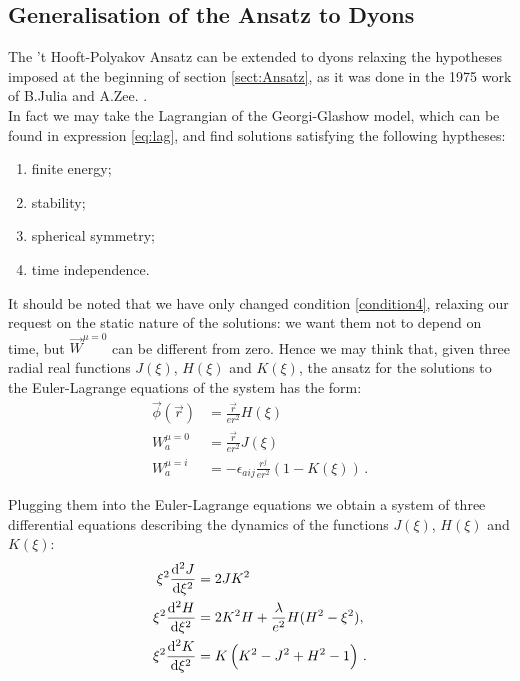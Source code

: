 \documentclass[main.tex]{subfiles}
\begin{document}
\subsection{Generalisation of the Ansatz to Dyons}
The 't Hooft-Polyakov Ansatz can be extended to dyons relaxing the hypotheses imposed at the beginning of section \ref{sect:Ansatz}, as it was done in the 1975 work of B.Julia and A.Zee. \cite{Julia:Dyon}.\\

In fact we may take the Lagrangian of the Georgi-Glashow model, which can be found in expression \eqref{eq:lag}, and find solutions satisfying the following hyptheses:
 \begin{enumerate}
     \item finite energy; 
     \item stability; 
     \item spherical symmetry;
     \item time independence. \label{condition4}
 \end{enumerate}
 It should be noted that we have only changed condition \ref{condition4}, relaxing our request on the static nature of the solutions: we want them not to depend on time, but $\vec{W}^{\mu=0}$ can be different from zero. Hence we may think that, given three radial real functions $J(\xi)$, $H(\xi)$ and $K(\xi)$, the ansatz for the solutions to the Euler-Lagrange equations of the system has the form:
   \begin{align}
      \vec{\phi}(\vec{r}) &= \frac{\vec{r}}{er^2}H(\xi) \\ 
      W^{\mu=0}_{a}&= \frac{\vec{r}}{er^2}J(\xi) \\  
      W^{\mu =i}_{a} &= - \epsilon_{aij}\frac{r^j}{er^2}(1 - K(\xi)) \,.
  \end{align}
  
  Plugging  them into the Euler-Lagrange equations we obtain a system of three differential equations describing the dynamics of the functions $J(\xi)$, $H(\xi)$ and $K(\xi)$: 
%
\begin{subequations} \label{eq:dyon-equations} 
 \begin{align}
  \xi ^2 \dv[2]{J}{\xi} &= 2JK^2   \label{eq:J2}\\
  \xi ^2 \dv[2]{H}{\xi} &= 2K^2H + \frac{\lambda}{e^2}H (H^2 -\xi^2), \label{eq:H2}\\
  \xi ^2 \dv[2]{K}{\xi} &= K \left( K ^2 -J^2 + H^2 -1   \right)  \label{eq:K2}\,.
  \end{align}
\end{subequations}
\end{document}
